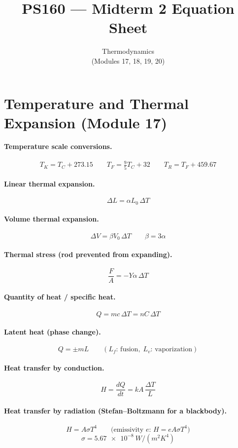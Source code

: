 \documentclass[11pt]{article}
\title{PS160 --- Midterm 2 Equation Sheet}
\author{Thermodynamics \\ (Modules 17, 18, 19, 20)}
\date{}
\begin{document}
\maketitle

\section*{Temperature and Thermal Expansion (Module 17)}

\paragraph{Temperature scale conversions.}
\[
T_{K} = T_{C} + 273.15
\qquad
T_{F} = \tfrac{9}{5}T_{C} + 32
\qquad
T_{R} = T_{F} + 459.67
\]

\paragraph{Linear thermal expansion.}
\[
\Delta L = \alpha L_{0}\,\Delta T
\]

\paragraph{Volume thermal expansion.}
\[
\Delta V = \beta V_{0}\,\Delta T
\qquad
\beta = 3\alpha
\]

\paragraph{Thermal stress (rod prevented from expanding).}
\[
\frac{F}{A} = -Y \alpha\,\Delta T
\]

\paragraph{Quantity of heat / specific heat.}
\[
Q = m c\,\Delta T = n C\,\Delta T
\]

\paragraph{Latent heat (phase change).}
\[
Q = \pm m L
\qquad (L_{f}\text{: fusion},\; L_{v}\text{: vaporization})
\]

\paragraph{Heat transfer by conduction.}
\[
H = \frac{dQ}{dt} = k A\,\frac{\Delta T}{L}
\]

\paragraph{Heat transfer by radiation (Stefan--Boltzmann for a blackbody).}
\[
H = A\sigma T^{4}
\qquad\text{(emissivity $e$: } H = e A\sigma T^{4}\text{)}
\]
\[
\sigma = \SI{5.67e-8}{W/(m^{2} K^{4})}
\]
\end{document}

